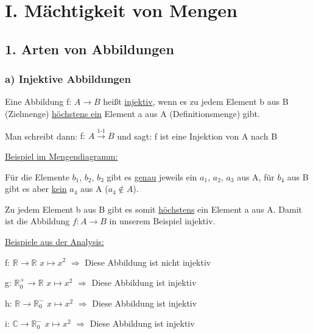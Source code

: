 \documentclass[12pt]{article}
\begin{document}
    \section*{I. Mächtigkeit von Mengen}

		\subsection*{1. Arten von Abbildungen}
		
		\subsubsection*{a) Injektive Abbildungen}
		
		Eine Abbildung f: $A \rightarrow B$ heißt \underline{injektiv}, wenn es zu jedem Element b aus B 
		(Zielmenge) \underline{höchstens ein} Element a aus A (Definitionsmenge) gibt.
		
		Man schreibt dann: {\color{blue}f: $A \xrightarrow{\text{1-1}} B$} und sagt: {\color{blue}f ist 
		eine Injektion von A nach B}
		
		\underline{Beispiel im Mengendiagramm:}		
		
		
		Für die Elemente $b_1$, $b_2$, $b_3$ gibt es \underline{genau} jeweils ein $a_1$, $a_2$, $a_3$
		aus A, für $b_4$ aus B gibt es aber \underline{kein} $a_4$ aus A ($a_4 \not \in A$).
		
		Zu jedem Element b aus B gibt es somit \underline{höchstens} ein Element a aus A. 
		Damit ist die Abbildung $f: A \rightarrow B$ in unserem Beispiel injektiv.
		
		\underline{Beispiele aus der Analysis:}
		
		f: $\mathbb{R} \rightarrow \mathbb{R}$ \hspace*{2mm} $x \mapsto x^2$ $\Rightarrow$ Diese Abbildung ist nicht injektiv
		
		g: $\mathbb{R}_0^+ \rightarrow \mathbb{R}$ \hspace*{2mm} $x \mapsto x^2$ $\Rightarrow$ Diese Abbildung ist injektiv
		
		h: $\mathbb{R} \rightarrow \mathbb{R}_0^-$ \hspace*{2mm} $x \mapsto x^2$ $\Rightarrow$ Diese Abbildung ist injektiv
		
		i: $\mathbb{C} \rightarrow \mathbb{R}_0^-$ \hspace*{2mm} $x \mapsto x^2$ $\Rightarrow$ Diese Abbildung ist injektiv
		
\end{document}
